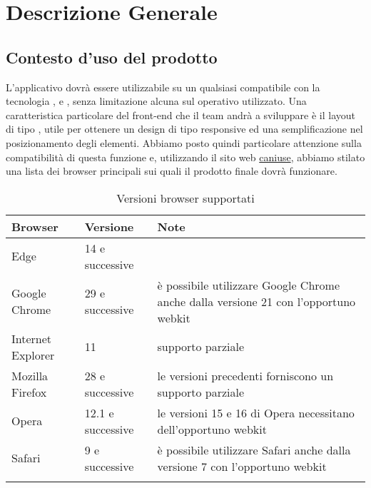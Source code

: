 \documentclass[../AnalisiDeiRequisiti_v4.0.0.tex]{subfiles}
\begin{document}
\section{Descrizione Generale}
	\subsection{Contesto d'uso del prodotto}
	L'applicativo dovrà essere utilizzabile su un qualsiasi  compatibile con la tecnologia ,  e , senza limitazione alcuna sul  operativo utilizzato.
	Una caratteristica particolare del front-end che il team andrà a sviluppare è il layout di tipo , utile per ottenere un design di tipo responsive ed una semplificazione nel posizionamento degli elementi.
	Abbiamo posto quindi particolare attenzione sulla compatibilità di questa funzione e, utilizzando il sito web \href{http://caniuse.com/#search=flexible}{caniuse}, abbiamo stilato una lista dei browser principali sui quali il prodotto finale dovrà funzionare.
 
	\vspace{0.5cm}
	\begin{longtabu} to \textwidth {
	X[3,c,m] 
	X[3,c,m]
	X[6,c,m]}
	\toprule
	\textbf{Browser} & \textbf{Versione}  & \textbf{Note} \\
	\midrule
	\endhead
	Edge & 14 e successive &  \\
	\addlinespace[0.4em]
	\midrule
	\addlinespace[0.4em]
	Google Chrome & 29 e successive & è possibile utilizzare Google Chrome anche dalla versione 21 con l'opportuno webkit \\
	\addlinespace[0.4em]
	\midrule
	\addlinespace[0.4em]	
	Internet Explorer & 11 & supporto parziale \\
	\addlinespace[0.4em]
	\midrule
	\addlinespace[0.4em]
	Mozilla Firefox & 28 e successive & le versioni precedenti forniscono un supporto parziale \\
	\addlinespace[0.4em]
	\midrule
	\addlinespace[0.4em]
	Opera & 12.1 e successive & le versioni 15 e 16 di Opera necessitano dell'opportuno webkit \\
	\addlinespace[0.4em]
	\midrule
	\addlinespace[0.4em]
	Safari & 9 e successive & è possibile utilizzare Safari anche dalla versione 7 con l'opportuno webkit \\
	\addlinespace[0.5em]
	\bottomrule
	\caption{Versioni browser supportati}
	\label{tab:browser}
	\end{longtabu}
	
\end{document}

